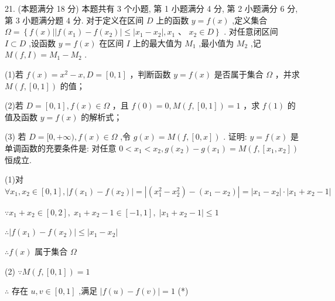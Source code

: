\documentclass[10pt]{article}
\begin{document}
21. (本题满分 18 分) 本题共有 3 个小题, 第 1 小题满分 4 分, 第 2 小题满分 6 分, 第 3 小题满分题 4 分. 对于定义在区间 \(D\) 上的函数 \(y = f\left( x\right)\) ,定义集合 \(\Omega  = \left\{  {f\left( x\right) \left| \right| f\left( {x}_{1}\right)  - f\left( {x}_{2}\right) \left|  \leq  \right| {x}_{1} - {x}_{2}\mid ,{x}_{1}\text{ 、 }{x}_{2} \in  D}\right\}\) . 对任意闭区间 \(I \subset  D\) ,设函数 \(y = f\left( x\right)\) 在区间 \(I\) 上的最大值为 \({M}_{1}\) ,最小值为 \({M}_{2}\) ,记 \(M\left( {f,I}\right)  = {M}_{1} - {M}_{2}\) .

(1)若 \(f\left( x\right)  = {x}^{2} - x,D = \left\lbrack  {0,1}\right\rbrack\) ，判断函数 \(y = f\left( x\right)\) 是否属于集合 \(\Omega\) ，并求 \(M\left( {f,\left\lbrack  {0,1}\right\rbrack  }\right)\) 的值；

(2)若 \(D = \left\lbrack  {0,1}\right\rbrack  ,f\left( x\right)  \in  \Omega\) ，且 \(f\left( 0\right)  = 0,M\left( {f,\left\lbrack  {0,1}\right\rbrack  }\right)  = 1\) ，求 \(f\left( 1\right)\) 的值及函数 \(y = f\left( x\right)\) 的解析式；

(3) 若 \(D = \lbrack 0, + \infty ),f\left( x\right)  \in  \Omega\) ,令 \(g\left( x\right)  = M\left( {f,\left\lbrack  {0,x}\right\rbrack  }\right)\) . 证明: \(y = f\left( x\right)\) 是单调函数的充要条件是: 对任意 \(0 < {x}_{1} < {x}_{2},g\left( {x}_{2}\right)  - g\left( {x}_{1}\right)  = M\left( {f,\left\lbrack  {{x}_{1},{x}_{2}}\right\rbrack  }\right)\) 恒成立.

(1)对 \(\forall {x}_{1},{x}_{2} \in  \left\lbrack  {0,1}\right\rbrack  ,\left| {f\left( {x}_{1}\right)  - f\left( {x}_{2}\right) }\right|  = \left| {\left( {{x}_{1}^{2} - {x}_{2}^{2}}\right)  - \left( {{x}_{1} - {x}_{2}}\right) }\right|  = \left| {{x}_{1} - {x}_{2}}\right|  \cdot  \left| {{x}_{1} + {x}_{2} - 1}\right|\)

\(\because {x}_{1} + {x}_{2} \in  \left\lbrack  {0,2}\right\rbrack  ,\;{x}_{1} + {x}_{2} - 1 \in  \left\lbrack  {-1,1}\right\rbrack  ,\;\left| {{x}_{1} + {x}_{2} - 1}\right|  \leq  1\)

\(\therefore \left| {f\left( {x}_{1}\right)  - f\left( {x}_{2}\right) }\right|  \leq  \left| {{x}_{1} - {x}_{2}}\right|\)

\(\therefore f\left( x\right)\) 属于集合 \(\Omega\)

(2) \(\because M\left( {f,\left\lbrack  {0,1}\right\rbrack  }\right)  = 1\)

\(\therefore\) 存在 \(u,v \in  \left\lbrack  {0,1}\right\rbrack\) ,满足 \(\left| {f\left( u\right)  - f\left( v\right) }\right|  = 1\) (*)
\end{document}
